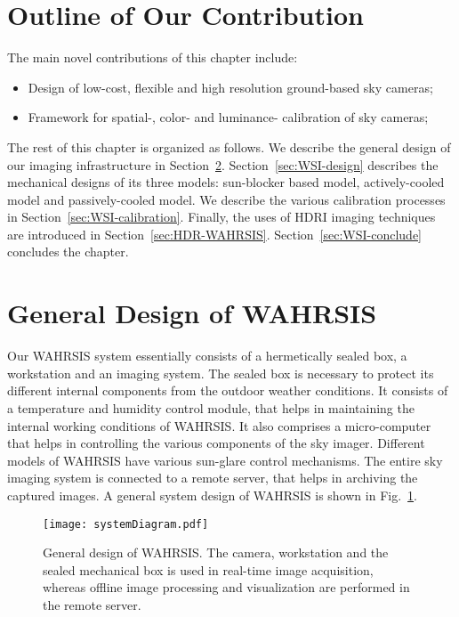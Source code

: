 \section{Outline of Our Contribution}

The main novel contributions of this chapter include: 

\begin{itemize}
\item Design of low-cost, flexible and high resolution ground-based sky cameras;
\item Framework for spatial-, color- and luminance- calibration of sky cameras;
\end{itemize}


The rest of this chapter is organized as follows. We describe the general design of our imaging infrastructure in Section~\ref{sec:gen-design}. Section~\ref{sec:WSI-design} describes the mechanical designs of its three models: sun-blocker based model, actively-cooled model and passively-cooled model. We describe the various calibration processes in Section~\ref{sec:WSI-calibration}. Finally, the uses of HDRI imaging techniques are introduced in Section~\ref{sec:HDR-WAHRSIS}. Section~\ref{sec:WSI-conclude} concludes the chapter. 

\section{General Design of WAHRSIS} 
\label{sec:gen-design}
Our WAHRSIS system essentially consists of a hermetically sealed box, a workstation and an imaging system. The sealed box is necessary to protect its different internal components from the outdoor weather conditions. It consists of a temperature and humidity control module, that helps in maintaining the internal working conditions of WAHRSIS. It also comprises a micro-computer that helps in controlling the various components of the sky imager. Different models of WAHRSIS have various sun-glare control mechanisms. The entire sky imaging system is connected to a remote server, that helps in archiving the captured images. A general system design of WAHRSIS is shown in Fig.~\ref{fig:sysDesign}.  

\begin{figure}[htb]
\begin{center}
\texttt{[image: systemDiagram.pdf]}
\caption[General design of WAHRSIS.]{General design of WAHRSIS. The camera, workstation and the sealed mechanical box is used in real-time image acquisition, whereas offline image processing and visualization are performed in the remote server.\label{fig:sysDesign}}
\end{center}
\end{figure}

